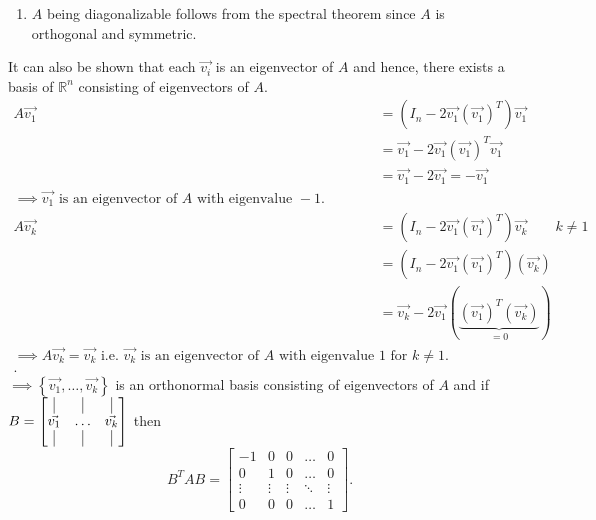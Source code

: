 \documentclass{report}
\begin{document}
{\begin{enumerate}[label=(\roman*).]
\begin{align*}
       &= I_n - 4 \left( \vec{ v_1}  \right) \left( \vec{ v_1}  \right) ^{T} + 4 \left( \vec{ v_1}  \right) \left( \vec{ v_1}  \right) ^{T} \left( \vec{ v_1}  \right) \left( \vec{ v_1}  \right) ^{T}\\
       &= I_n - 4 \left( \vec{ v_1}  \right) \left( \vec{ v_1}  \right) ^{T} + 4 \left( \vec{ v_1}  \right) \left( \vec{ v_1}  \right) ^{T}\\
       &= I_n\\ 
       &\implies A^{T}A = I_n \text{ i.e. } A \text{ is orthogonal.}
      .\end{align*}
     \item
      $ A$ being diagonalizable follows from the spectral theorem since $ A$ is orthogonal and symmetric. \\
   \end{enumerate}
   
   It can also be shown that each $ \vec{ v_i} $ is an eigenvector of $ A$  and hence, there exists a basis of $ \mathbb{R} ^{n}$ consisting of eigenvectors of $ A$. \\
   \begin{align*}
    A \vec{ v_1} &= \left( I_n - 2 \vec{ v_1} \left( \vec{ v_1}  \right) ^{T} \right) \vec{ v_1}\\
    &= \vec{ v_1} - 2 \vec{ v_1} \left( \vec{ v_1}  \right) ^{T} \vec{ v_1}\\
    &= \vec{ v_1} - 2 \vec{ v_1} = - \vec{ v_1}\\
    \implies \vec{ v_1} \text{ is an eigenvector of } A \text{ with eigenvalue } -1.\\
    A \vec{ v_k} &= \left( I_n - 2 \vec{ v_1} \left( \vec{ v_1}  \right) ^{T} \right) \vec{ v_k} \qquad  k \neq 1\\
    &= \left( I_n -2 \vec{ v_1} \left( \vec{ v_1}  \right) ^{T} \right) \left( \vec{ v_k} \right)\\
    &= \vec{ v_k} - 2 \vec{ v_1} \left( \underbrace{ \left( \vec{ v_1}  \right) ^{T} \left( \vec{ v_k}  \right)  }_{ =0 } \right)\\
    \implies A \vec{ v_k} = \vec{ v_k} 
    \text{ i.e. } \vec{ v_k} \text{ is an eigenvector of } A \text{ with eigenvalue } 1 \text{ for } k \neq 1.\\
   .\end{align*}
   $ \implies \left\{ \vec{ v_1} , \ldots , \vec{ v_k}  \right\} $  is an orthonormal basis consisting of eigenvectors of $ A$ and if $ B = \begin{bmatrix}
   \vline & \vline & \vline\\
   \vec{ v_1}  & \ldots & \vec{ v_k} \\
   \vline & \vline & \vline\\
   \end{bmatrix}$ then 
   \[
   B ^{ T} A B = \begin{bmatrix}
       -1 & 0 & 0 & \dots  & 0 \\
       0 & 1 & 0 & \dots  & 0 \\
       \vdots & \vdots & \vdots & \ddots & \vdots \\
       0 & 0 & 0 & \dots  & 1\end{bmatrix}
   .\] 
     
     
  }
\end{document}
